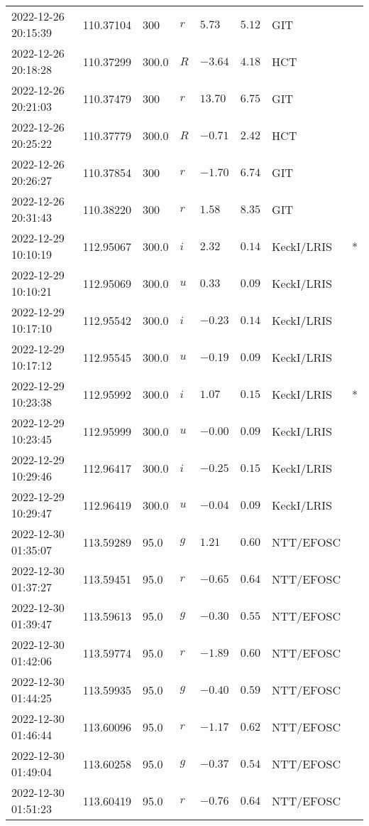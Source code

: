\documentclass{nature_plusfigure}
\begin{document}
\begin{supplement}
\begin{center}
\begin{longtable}{llllllll}
2022-12-26 20:15:39 & 110.37104 & 300 & $r$ & $5.73$ & $5.12$ & GIT &  \\ 
2022-12-26 20:18:28 & 110.37299 & 300.0 & $R$ & $-3.64$ & $4.18$ & HCT &  \\ 
2022-12-26 20:21:03 & 110.37479 & 300 & $r$ & $13.70$ & $6.75$ & GIT &  \\ 
2022-12-26 20:25:22 & 110.37779 & 300.0 & $R$ & $-0.71$ & $2.42$ & HCT &  \\ 
2022-12-26 20:26:27 & 110.37854 & 300 & $r$ & $-1.70$ & $6.74$ & GIT &  \\ 
2022-12-26 20:31:43 & 110.38220 & 300 & $r$ & $1.58$ & $8.35$ & GIT &  \\ 
2022-12-29 10:10:19 & 112.95067 & 300.0 & $i$ & $2.32$ & $0.14$ & KeckI/LRIS & * \\ 
2022-12-29 10:10:21 & 112.95069 & 300.0 & $u$ & $0.33$ & $0.09$ & KeckI/LRIS &  \\ 
2022-12-29 10:17:10 & 112.95542 & 300.0 & $i$ & $-0.23$ & $0.14$ & KeckI/LRIS &  \\ 
2022-12-29 10:17:12 & 112.95545 & 300.0 & $u$ & $-0.19$ & $0.09$ & KeckI/LRIS &  \\ 
2022-12-29 10:23:38 & 112.95992 & 300.0 & $i$ & $1.07$ & $0.15$ & KeckI/LRIS & * \\ 
2022-12-29 10:23:45 & 112.95999 & 300.0 & $u$ & $-0.00$ & $0.09$ & KeckI/LRIS &  \\ 
2022-12-29 10:29:46 & 112.96417 & 300.0 & $i$ & $-0.25$ & $0.15$ & KeckI/LRIS &  \\ 
2022-12-29 10:29:47 & 112.96419 & 300.0 & $u$ & $-0.04$ & $0.09$ & KeckI/LRIS &  \\ 
2022-12-30 01:35:07 & 113.59289 & 95.0 & $g$ & $1.21$ & $0.60$ & NTT/EFOSC &  \\ 
2022-12-30 01:37:27 & 113.59451 & 95.0 & $r$ & $-0.65$ & $0.64$ & NTT/EFOSC &  \\ 
2022-12-30 01:39:47 & 113.59613 & 95.0 & $g$ & $-0.30$ & $0.55$ & NTT/EFOSC &  \\ 
2022-12-30 01:42:06 & 113.59774 & 95.0 & $r$ & $-1.89$ & $0.60$ & NTT/EFOSC &  \\ 
2022-12-30 01:44:25 & 113.59935 & 95.0 & $g$ & $-0.40$ & $0.59$ & NTT/EFOSC &  \\ 
2022-12-30 01:46:44 & 113.60096 & 95.0 & $r$ & $-1.17$ & $0.62$ & NTT/EFOSC &  \\ 
2022-12-30 01:49:04 & 113.60258 & 95.0 & $g$ & $-0.37$ & $0.54$ & NTT/EFOSC &  \\ 
2022-12-30 01:51:23 & 113.60419 & 95.0 & $r$ & $-0.76$ & $0.64$ & NTT/EFOSC &  \\ 

\end{longtable}
\end{center}
\end{supplement}
\end{document}
